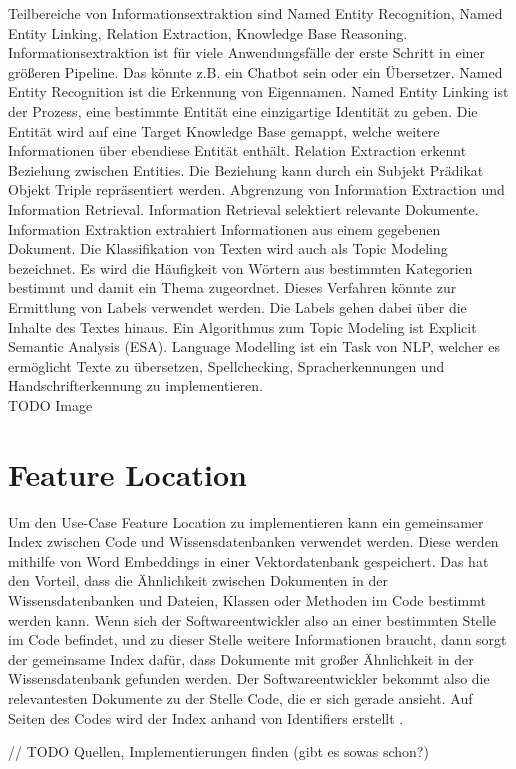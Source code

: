 Teilbereiche von Informationsextraktion sind Named Entity Recognition, Named Entity Linking, Relation Extraction, Knowledge Base Reasoning.
Informationsextraktion ist für viele Anwendungsfälle der erste Schritt in einer größeren Pipeline.
Das könnte z.B. ein Chatbot sein oder ein Übersetzer.
Named Entity Recognition ist die Erkennung von Eigennamen.
Named Entity Linking ist der Prozess, eine bestimmte Entität eine einzigartige Identität zu geben.
Die Entität wird auf eine Target Knowledge Base gemappt, welche weitere Informationen über ebendiese Entität enthält.
Relation Extraction erkennt Beziehung zwischen Entities.
Die Beziehung kann durch ein Subjekt Prädikat Objekt Triple repräsentiert werden.
Abgrenzung von Information Extraction und Information Retrieval.
Information Retrieval selektiert relevante Dokumente.
Information Extraktion extrahiert Informationen aus einem gegebenen Dokument.
Die Klassifikation von Texten wird auch als Topic Modeling bezeichnet.
Es wird die Häufigkeit von Wörtern aus bestimmten Kategorien bestimmt und damit ein Thema zugeordnet.
Dieses Verfahren könnte zur Ermittlung von Labels verwendet werden.
Die Labels gehen dabei über die Inhalte des Textes hinaus.
Ein Algorithmus zum Topic Modeling ist Explicit Semantic Analysis (ESA).
Language Modelling ist ein Task von NLP, welcher es ermöglicht Texte zu übersetzen, Spellchecking, Spracherkennungen und Handschrifterkennung zu implementieren.\\

TODO Image

\section{Feature Location}

Um den Use-Case Feature Location zu implementieren kann ein gemeinsamer Index zwischen Code und Wissensdatenbanken verwendet werden.
Diese werden mithilfe von Word Embeddings in einer Vektordatenbank gespeichert.
Das hat den Vorteil, dass die Ähnlichkeit zwischen Dokumenten in der Wissensdatenbanken und Dateien, Klassen oder Methoden im Code bestimmt werden kann.
Wenn sich der Softwareentwickler also an einer bestimmten Stelle im Code befindet, und zu dieser Stelle weitere Informationen braucht, dann sorgt der gemeinsame Index dafür, dass Dokumente mit großer Ähnlichkeit in der Wissensdatenbank gefunden werden.
Der Softwareentwickler bekommt also die relevantesten Dokumente zu der Stelle Code, die er sich gerade ansieht.
Auf Seiten des Codes wird der Index anhand von Identifiers erstellt \cite{Marcus_Maletic_2003}.

// TODO Quellen, Implementierungen finden (gibt es sowas schon?)